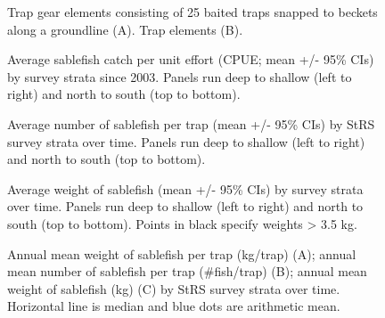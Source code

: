 \documentclass[12pt]{article}\usepackage[]{graphicx}\usepackage[]{color}
\begin{document}
\begin{figure}[htb]

{\centering {} 

}

\caption{Trap gear elements consisting of 25 baited traps snapped to beckets along a groundline (A). Trap elements (B).}\label{fig:figure5}
\end{figure}
\clearpage

\clearpage


\begin{figure}[htb]

{\centering {} 

}

\caption{Average sablefish catch per unit effort (CPUE; mean +/- 95\% CIs) by survey strata since 2003. Panels run deep to shallow (left to right) and north to south (top to bottom).}\label{fig:figure6}
\end{figure}
\clearpage


\begin{figure}[htb]

{\centering {} 

}

\caption{Average number of sablefish per trap (mean +/- 95\% CIs) by StRS survey strata over time. Panels run deep to shallow (left to right) and north to south (top to bottom).}\label{fig:figure7}
\end{figure}
\clearpage


\begin{figure}[htb]

{\centering {} 

}

\caption{Average weight of sablefish (mean +/- 95\% CIs) by survey strata over time. Panels run deep to shallow (left to right) and north to south (top to bottom). Points in black specify weights \textgreater{} 3.5 kg.}\label{fig:figure8}
\end{figure}
\clearpage


\begin{figure}[htb]

{\centering {} 

}

\caption{Annual mean weight of sablefish per trap (kg/trap) (A); annual mean number of sablefish per trap (\#fish/trap) (B); annual mean weight of sablefish (kg) (C) by StRS survey strata over time. Horizontal line is median and blue dots are arithmetic mean.}\label{fig:figure9}
\end{figure}
\clearpage
\end{document}
